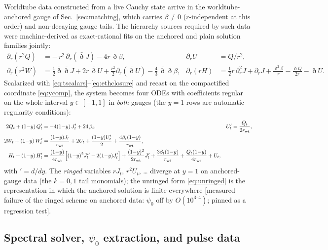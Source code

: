 \begin{nfblock}
Worldtube data constructed from a live Cauchy state arrive in the
worldtube-anchored gauge of Sec.~\ref{sec:matching}, which carries
$\beta \neq 0$ ($r$-independent at this order) and non-decaying gauge
tails. The hierarchy sources required by such data were machine-derived
as exact-rational fits on the anchored and plain solution families
jointly:
\begin{align}
\partial_r(r^2 Q) &= -\,r^2\,\partial_r(\bar\eth J) - 4r\,\eth\beta,
&
\partial_r U &= Q/r^2,
\nonumber\\
\partial_r(r^2 W) &= \tfrac12\bar\eth\bar\eth J + 2r\,\bar\eth U
 + \tfrac{r^2}{2}\partial_r(\bar\eth U) - \tfrac43\,\bar\eth\eth\beta,
&
\partial_r(rH) &= \tfrac12 r\,\partial_r^2 J + \partial_r J
 + \frac{\eth^2\beta}{r} - \frac{\eth Q}{2r} - \eth U .
\label{eq:beta-hierarchy}
\end{align}
Scalarized with \eqref{eq:tscalars}--\eqref{eq:ethclosure} and recast on
the compactified coordinate \eqref{eq:ycomp}, the system becomes four
ODEs with coefficients regular on the whole interval $y\in[-1,1]$ in
\emph{both} gauges (the $y=1$ rows are automatic regularity conditions):
\begin{align}
2Q_t + (1{-}y)\,Q_t' &= -4(1{-}y)\,J_t' + 24\,\beta_t,
&
U_t' &= \frac{Q_t}{2 r_{\rm wt}},
\nonumber\\
2W_t + (1{-}y)\,W_t' &= \frac{(1{-}y)J_t}{r_{\rm wt}} + 2U_t
 + \frac{(1{-}y)U_t'}{2} + \frac{4\beta_t(1{-}y)}{r_{\rm wt}},
&&
\label{eq:unringed}
\\
H_t + (1{-}y)\,H_t' &=
 \frac{(1{-}y)}{4r_{\rm wt}}\Big[(1{-}y)^2J_t'' - 2(1{-}y)J_t'\Big]
 + \frac{(1{-}y)^2}{2r_{\rm wt}}J_t'
 + \frac{3\beta_t(1{-}y)}{r_{\rm wt}}
 + \frac{Q_t(1{-}y)}{4r_{\rm wt}} + U_t,
&&
\nonumber
\end{align}
with $' = d/dy$. The \emph{ringed} variables $rJ_t$, $r^2U_t$, \dots{}
diverge at $y=1$ on anchored-gauge data (the $k=0,1$ tail monomials);
the unringed form \eqref{eq:unringed} is the representation in which the
anchored solution is finite everywhere [measured failure of the ringed
scheme on anchored data: $\psi_0$ off by $O(10^{3\text{--}4})$; pinned
as a regression test].
\end{nfblock}

\subsection{Spectral solver, $\psi_0$ extraction, and pulse data}
\label{sec:solver}

